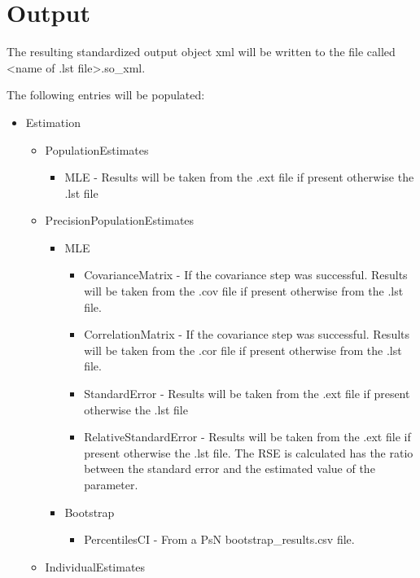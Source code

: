 \section{Output}

The resulting standardized output object xml will be written to the file called <name of .lst file>.so\_xml.

The following entries will be populated:

\begin{itemize}
    \item Estimation
        \begin{itemize}
            \item PopulationEstimates
            \begin{itemize}
                \item MLE - Results will be taken from the .ext file if present otherwise the .lst file
            \end{itemize}
            \item PrecisionPopulationEstimates
            \begin{itemize}
                \item MLE
                \begin{itemize}
                    \item CovarianceMatrix - If the covariance step was successful. Results will be taken from the .cov file if present otherwise from the .lst file.
                    \item CorrelationMatrix - If the covariance step was successful. Results will be taken from the .cor file if present otherwise from the .lst file.
                    \item StandardError - Results will be taken from the .ext file if present otherwise the .lst file
                    \item RelativeStandardError - Results will be taken from the .ext file if present otherwise the .lst file. The RSE is calculated has the ratio between the standard error and the estimated value of the parameter.
                \end{itemize}
                \item Bootstrap
                \begin{itemize}
                    \item PercentilesCI - From a PsN bootstrap\_results.csv file.
                \end{itemize}
            \end{itemize}
            \item IndividualEstimates

\end{itemize}
\end{itemize}
